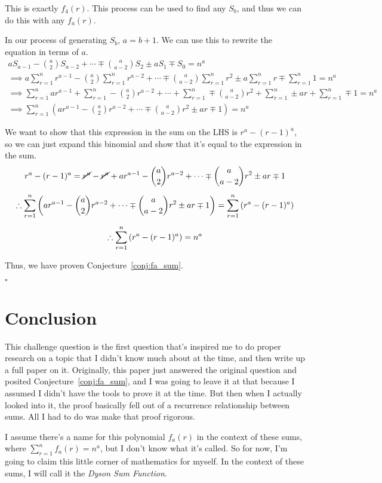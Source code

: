 \documentclass[a4paper]{article}
\newcommand{\sn}{\sum\limits_{r=1}^{n}}
\begin{document}
This is exactly $f_4(r)$. This process can be used to find any $S_b$, and thus we can do this with any $f_a(r)$.

In our process of generating $S_b$, $a = b + 1$. We can use this to rewrite the equation in terms of $a$.
\begin{gather*}
aS_{a-1} - \binom{a}{2}S_{a-2} + \cdots \mp \binom{a}{a-2}S_2 \pm aS_1 \mp S_0 = n^a\\[0.5em]
\implies a \sn r^{a-1} - \binom{a}{2} \sn r^{a-2} + \cdots \mp \binom{a}{a-2} \sn r^2 \pm a \sn r \mp \sn 1 = n^a\\[0.5em]
\implies \sn a r^{a-1} + \sn -\binom{a}{2} r^{a-2} + \cdots + \sn \mp \binom{a}{a-2} r^2 + \sn \pm a r + \sn \mp 1 = n^a\\[0.5em]
\implies \sn \left( a r^{a-1} - \binom{a}{2} r^{a-2} + \cdots \mp \binom{a}{a-2} r^2 \pm a r \mp 1 \right) = n^a
\end{gather*}

We want to show that this expression in the sum on the LHS is $r^a - (r-1)^a$, so we can just expand this binomial and show that it's equal to the expression in the sum.
\begin{gather*}
r^a - (r-1)^a = \cancel{r^a} - \cancel{r^a} + ar^{a-1} - \binom{a}{2} r^{a-2} + \cdots \mp \binom{a}{a-2} r^2 \pm a r \mp 1\\[0.5em]
\therefore \sn \left( a r^{a-1} - \binom{a}{2} r^{a-2} + \cdots \mp \binom{a}{a-2} r^2 \pm a r \mp 1 \right) = \sn \left( r^a - (r-1)^a \right)\\[0.5em]
\therefore \sn \left( r^a - (r-1)^a \right) = n^a
\end{gather*}

Thus, we have proven Conjecture~\ref{conj:fa_sum}.

\hspace*{\fill}$\square$

\section{Conclusion}

This challenge question is the first question that's inspired me to do proper research on a topic that I didn't know much about at the time, and then write up a full paper on it. Originally, this paper just answered the original question and posited Conjecture~\ref{conj:fa_sum}, and I was going to leave it at that because I assumed I didn't have the tools to prove it at the time. But then when I actually looked into it, the proof basically fell out of a recurrence relationship between sums. All I had to do was make that proof rigorous.

I assume there's a name for this polynomial $f_a(r)$ in the context of these sums, where $\sn f_a(r) = n^a$, but I don't know what it's called. So for now, I'm going to claim this little corner of mathematics for myself. In the context of these sums, I will call it the \textit{Dyson Sum Function}.

\printbibliography
\end{document}
